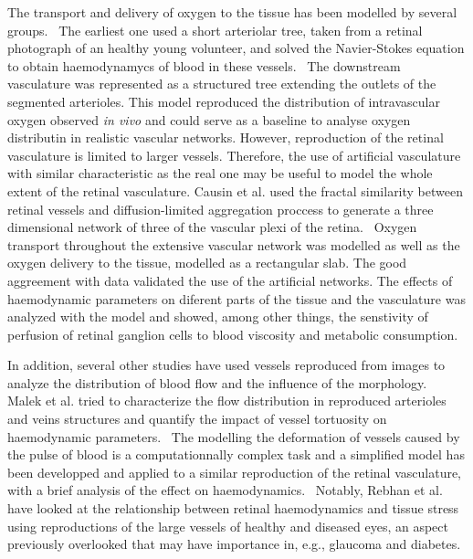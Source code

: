 \documentclass[12pt,a4paper]{journal}
\begin{document}
The transport and delivery of oxygen to the tissue has been modelled by several groups.~\cite{Aquah_2021,Causin_2015,Liu_2009}
The earliest one used a short arteriolar tree, taken from a retinal photograph of an healthy young volunteer, and solved the Navier-Stokes equation to obtain haemodynamycs of blood in these vessels.~\cite{Liu_2009}
The downstream vasculature was represented as a structured tree extending the outlets of the segmented arterioles.
This model reproduced the distribution of intravascular oxygen observed \textit{in vivo} and could serve as a baseline to analyse oxygen distributin in realistic vascular networks.
However, reproduction of the retinal vasculature is limited to larger vessels.
Therefore, the use of artificial vasculature with similar characteristic as the real one may be useful to model the whole extent of the retinal vasculature.
Causin et al. used the fractal similarity between retinal vessels and diffusion-limited aggregation proccess to generate a three dimensional network of three of the vascular plexi of the retina.~\cite{Causin_2015}
Oxygen transport throughout the extensive vascular network was modelled as well as the oxygen delivery to the tissue, modelled as a rectangular slab.
The good aggreement with data validated the use of the artificial networks.
The effects of haemodynamic parameters on diferent parts of the tissue and the vasculature was analyzed with the model and showed, among other things, the senstivity of perfusion of retinal ganglion cells to blood viscosity and metabolic consumption.~\cite{Causin_2015}

In addition, several other studies have used vessels reproduced from images to analyze the distribution of blood flow and the influence of the morphology.~\cite{Malek_2014,Malek_2015,Rebhan_2019}
Malek et al. tried to characterize the flow distribution in reproduced arterioles and veins structures and quantify the impact of vessel tortuosity on haemodynamic parameters.~\cite{Malek_2014,Malek_2015}
The modelling the deformation of vessels caused by the pulse of blood is a computationnally complex task and a simplified model has been developped and applied to a similar reproduction of the retinal vasculature, with a brief analysis of the effect on haemodynamics.~\cite{Aletti_2016}
Notably, Rebhan et al. have looked at the relationship between retinal haemodynamics and tissue stress using reproductions of the large vessels of healthy and diseased eyes, an aspect previously overlooked that may have importance in, e.g., glaucoma and diabetes.~\cite{Rebhan_2019}
\end{document}
